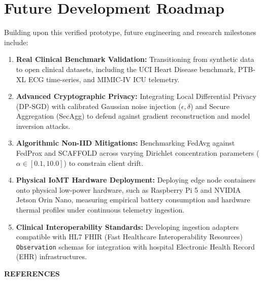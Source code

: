 \documentclass[12pt,a4paper,oneside]{report}
\begin{document}
\section{Future Development Roadmap}
Building upon this verified prototype, future engineering and research milestones include:
\begin{enumerate}
    \item \textbf{Real Clinical Benchmark Validation:} Transitioning from synthetic data to open clinical datasets, including the UCI Heart Disease benchmark, PTB-XL ECG time-series, and MIMIC-IV ICU telemetry.
    \item \textbf{Advanced Cryptographic Privacy:} Integrating Local Differential Privacy (DP-SGD) with calibrated Gaussian noise injection ($\epsilon, \delta$) and Secure Aggregation (SecAgg) to defend against gradient reconstruction and model inversion attacks.
    \item \textbf{Algorithmic Non-IID Mitigations:} Benchmarking FedAvg against FedProx and SCAFFOLD across varying Dirichlet concentration parameters ($\alpha \in [0.1, 10.0]$) to constrain client drift.
    \item \textbf{Physical IoMT Hardware Deployment:} Deploying edge node containers onto physical low-power hardware, such as Raspberry Pi 5 and NVIDIA Jetson Orin Nano, measuring empirical battery consumption and hardware thermal profiles under continuous telemetry ingestion.
    \item \textbf{Clinical Interoperability Standards:} Developing ingestion adapters compatible with HL7 FHIR (Fast Healthcare Interoperability Resources) \texttt{Observation} schemas for integration with hospital Electronic Health Record (EHR) infrastructures.
\end{enumerate}

\clearpage
\begin{center}
{\fontsize{14pt}{18pt}\bfseries\selectfont REFERENCES}\\[1.5em]
\end{center}
\end{document}
